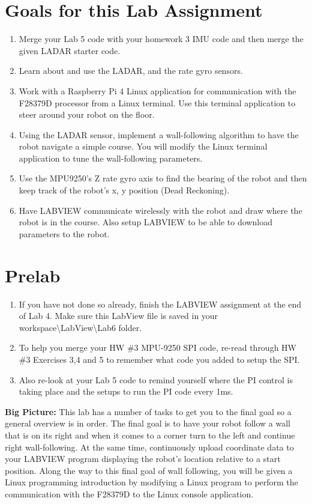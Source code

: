 \documentclass[11pt]{article}
\begin{document}
\MakeAssignmentTitle

\section*{Goals for this Lab Assignment}
%
\begin{enumerate}
    \item Merge your Lab 5 code with your homework 3 IMU code and then merge the given LADAR starter code.
    \item Learn about and use the LADAR, and the rate gyro sensors.
    \item Work with a Raspberry Pi 4 Linux application for communication with the F28379D processor from a Linux terminal. Use this terminal application to steer around your robot on the floor.
    \item Using the LADAR sensor, implement a wall-following algorithm to have the robot navigate a simple course. You will modify the Linux terminal application to tune the wall-following parameters.
    \item Use the MPU9250’s Z rate gyro axis to find the bearing of the robot and then keep track of the robot’s x, y position (Dead Reckoning).
    \item Have LABVIEW communicate wirelessly with the robot and draw where the robot is in the course. Also setup LABVIEW to be able to download parameters to the robot.
\end{enumerate}
%
\section*{Prelab}
%
\begin{enumerate}
    \item If you have not done so already, finish the LABVIEW assignment at the end of Lab 4. Make sure this LabView file is saved in your workspace\textbackslash LabView\textbackslash Lab6 folder.
    \item To help you merge your HW \#3 MPU-9250 SPI code, re-read through HW \#3 Exercises 3,4 and 5 to remember what code you added to setup the SPI.
    \item Also re-look at your Lab 5 code to remind yourself where the PI control is taking place and the setups to run the PI code every 1ms.
\end{enumerate}
%
\textbf{Big Picture:} This lab has a number of tasks to get you to the final goal so a general overview is in order. The final goal is to have your robot follow a wall that is on its right and when it comes to a corner turn to the left and continue right wall-following. At the same time, continuously upload coordinate data to your LABVIEW program displaying the robot’s location relative to a start position. Along the way to this final goal of wall following, you will be given a Linux programming introduction by modifying a Linux program to perform the communication with the F28379D to the Linux console application.
\end{document}
